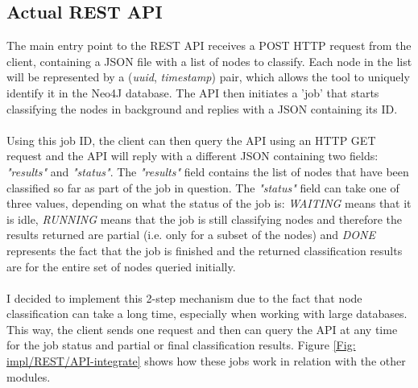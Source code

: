 	\subsection{Actual REST API} \label{Section: impl/REST/actual}
	The main entry point to the REST API receives a POST HTTP request from the client, containing a JSON file with a list of nodes to classify. Each node in the list will be represented by a (\textit{uuid}, \textit{timestamp}) pair, which allows the tool to uniquely identify it in the Neo4J database. The API then initiates a 'job' that starts classifying the nodes in background and replies with a JSON containing its ID.
	\\ \\
	Using this job ID, the client can then query the API using an HTTP GET request and the API will reply with a different JSON containing two fields: \textit{"results"} and \textit{"status"}. The \textit{"results"} field contains the list of nodes that have been classified so far as part of the job in question. The \textit{"status"} field can take one of three values, depending on what the status of the job is: \textit{WAITING} means that it is idle, \textit{RUNNING} means that the job is still classifying nodes and therefore the results returned are partial (i.e. only for a subset of the nodes) and \textit{DONE} represents the fact that the job is finished and the returned classification results are for the entire set of nodes queried initially. 
	\\ \\
	I decided to implement this 2-step mechanism due to the fact that node classification can take a long time, especially when working with large databases. This way, the client sends one request and then can query the API at any time for the job status and partial or final classification results. Figure \ref{Fig: impl/REST/API-integrate} shows how these jobs work in relation with the other modules.
	
